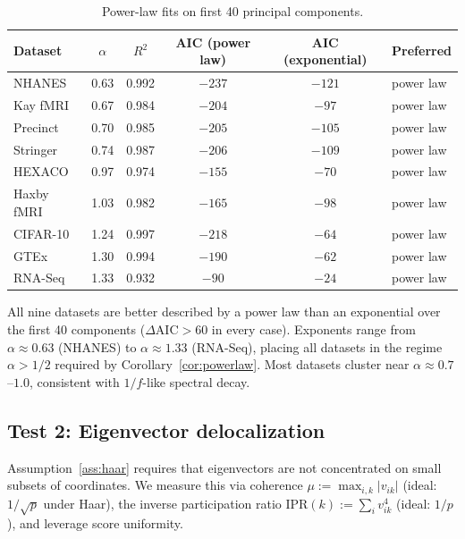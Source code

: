 \begin{table}[h]
\centering
\caption{Power-law fits on first 40 principal components.}
\label{tab:powerlaw}
\begin{tabular}{lccccl}
\toprule
Dataset & $\alpha$ & $R^2$ & AIC (power law) & AIC (exponential) & Preferred \\
\midrule
NHANES      & 0.63 & 0.992 & $-237$ & $-121$ & power law \\
Kay fMRI    & 0.67 & 0.984 & $-204$ & $-97$  & power law \\
Precinct    & 0.70 & 0.985 & $-205$ & $-105$ & power law \\
Stringer    & 0.74 & 0.987 & $-206$ & $-109$ & power law \\
HEXACO      & 0.97 & 0.974 & $-155$ & $-70$  & power law \\
Haxby fMRI  & 1.03 & 0.982 & $-165$ & $-98$  & power law \\
CIFAR-10    & 1.24 & 0.997 & $-218$ & $-64$  & power law \\
GTEx        & 1.30 & 0.994 & $-190$ & $-62$  & power law \\
RNA-Seq     & 1.33 & 0.932 & $-90$  & $-24$  & power law \\
\bottomrule
\end{tabular}
\end{table}

All nine datasets are better described by a power law than an exponential over
the first 40 components ($\Delta\text{AIC} > 60$ in every case).
Exponents range from $\alpha \approx 0.63$ (NHANES) to $\alpha \approx 1.33$ (RNA-Seq),
placing all datasets in the regime $\alpha > 1/2$ required by Corollary~\ref{cor:powerlaw}.
Most datasets cluster near $\alpha \approx 0.7$--$1.0$, consistent with $1/f$-like
spectral decay.

\subsection{Test 2: Eigenvector delocalization}

Assumption~\ref{ass:haar} requires that eigenvectors are not concentrated on small
subsets of coordinates. We measure this via coherence
$\mu := \max_{i,k} |v_{ik}|$ (ideal: $1/\sqrt{p}$ under Haar),
the inverse participation ratio $\text{IPR}(k) := \sum_i v_{ik}^4$ (ideal: $1/p$),
and leverage score uniformity.

